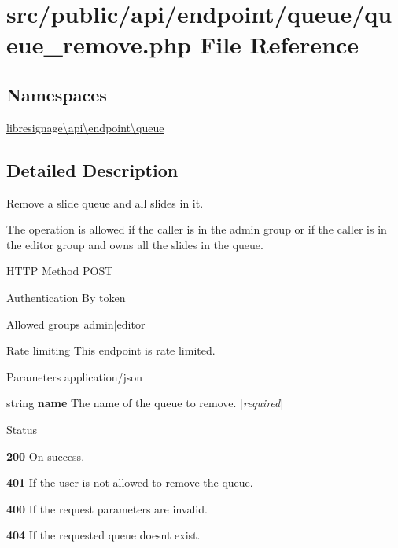 \hypertarget{src_2public_2api_2endpoint_2queue_2queue__remove_8php}{}\section{src/public/api/endpoint/queue/queue\+\_\+remove.php File Reference}
\label{src_2public_2api_2endpoint_2queue_2queue__remove_8php}
\subsection*{Namespaces}
\begin{DoxyCompactItemize}
\item 
 \hyperlink{namespacelibresignage_1_1api_1_1endpoint_1_1queue}{libresignage\textbackslash{}api\textbackslash{}endpoint\textbackslash{}queue}
\end{DoxyCompactItemize}


\subsection{Detailed Description}
Remove a slide queue and all slides in it.

The operation is allowed if the caller is in the \textquotesingle{}admin\textquotesingle{} group or if the caller is in the editor group and owns all the slides in the queue.

\begin{DoxyParagraph}{H\+T\+TP Method}
P\+O\+ST 
\end{DoxyParagraph}
\begin{DoxyParagraph}{Authentication}
By token 
\end{DoxyParagraph}
\begin{DoxyParagraph}{Allowed groups}
{\ttfamily admin$\vert$editor} 
\end{DoxyParagraph}
\begin{DoxyParagraph}{Rate limiting}
This endpoint is rate limited.
\end{DoxyParagraph}
\begin{DoxyParagraph}{Parameters}
application/json
\begin{DoxyItemize}
\item {\ttfamily string} {\bfseries name} The name of the queue to remove. \mbox{[}{\itshape required}\mbox{]}
\end{DoxyItemize}
\end{DoxyParagraph}
\begin{DoxyParagraph}{Status}

\begin{DoxyItemize}
\item {\bfseries 200} On success.
\item {\bfseries 401} If the user is not allowed to remove the queue.
\item {\bfseries 400} If the request parameters are invalid.
\item {\bfseries 404} If the requested queue doesn\textquotesingle{}t exist. 
\end{DoxyItemize}
\end{DoxyParagraph}
